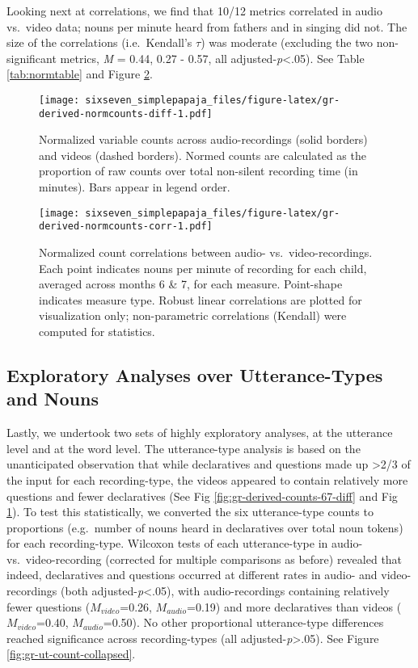 \documentclass[floatsintext,man]{apa6}
\theoremstyle{definition}
\theoremstyle{definition}
\theoremstyle{definition}
\theoremstyle{remark}
\begin{document}
Looking next at correlations, we find that 10/12 metrics correlated in
audio vs.~video data; nouns per minute heard from fathers and in singing
did not. The size of the correlations (i.e.~Kendall's \(\tau\)) was
moderate (excluding the two non-significant metrics, \emph{M} = 0.44,
0.27 - 0.57, all adjusted-\emph{p}\textless{}.05). See Table
\ref{tab:normtable} and Figure \ref{fig:gr-derived-normcounts-corr}.

\begin{figure}
\centering
\texttt{[image: sixseven\_simplepapaja\_files/figure-latex/gr-derived-normcounts-diff-1.pdf]}
\caption{\label{fig:gr-derived-normcounts-diff}Normalized variable counts
across audio-recordings (solid borders) and videos (dashed borders).
Normed counts are calculated as the proportion of raw counts over total
non-silent recording time (in minutes). Bars appear in legend order.}
\end{figure}

\begin{figure}
\centering
\texttt{[image: sixseven\_simplepapaja\_files/figure-latex/gr-derived-normcounts-corr-1.pdf]}
\caption{\label{fig:gr-derived-normcounts-corr}Normalized count correlations
between audio- vs.~video-recordings. Each point indicates nouns per
minute of recording for each child, averaged across months 6 \& 7, for
each measure. Point-shape indicates measure type. Robust linear
correlations are plotted for visualization only; non-parametric
correlations (Kendall) were computed for statistics.}
\end{figure}

\hypertarget{exploratory-analyses-over-utterance-types-and-nouns}{%
\subsection{Exploratory Analyses over Utterance-Types and
Nouns}\label{exploratory-analyses-over-utterance-types-and-nouns}}

Lastly, we undertook two sets of highly exploratory analyses, at the
utterance level and at the word level. The utterance-type analysis is
based on the unanticipated observation that while declaratives and
questions made up \textgreater{}2/3 of the input for each
recording-type, the videos appeared to contain relatively more questions
and fewer declaratives (See Fig \ref{fig:gr-derived-counts-67-diff} and
Fig \ref{fig:gr-derived-normcounts-diff}). To test this statistically,
we converted the six utterance-type counts to proportions (e.g.~number
of nouns heard in declaratives over total noun tokens) for each
recording-type. Wilcoxon tests of each utterance-type in audio-
vs.~video-recording (corrected for multiple comparisons as before)
revealed that indeed, declaratives and questions occurred at different
rates in audio- and video-recordings (both
adjusted-\emph{p}\textless{}.05), with audio-recordings containing
relatively fewer questions (\(M_{video}\)=0.26, \(M_{audio}\)=0.19) and
more declaratives than videos (\(M_{video}\)=0.40, \(M_{audio}\)=0.50).
No other proportional utterance-type differences reached significance
across recording-types (all adjusted-\emph{p}\textgreater{}.05). See
Figure \ref{fig:gr-ut-count-collapsed}.
\end{document}
